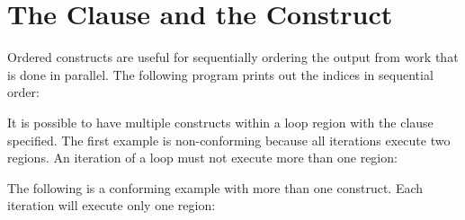 \pagebreak
\section{The  Clause and the  Construct}
\label{sec:ordered}

Ordered constructs  are useful for sequentially ordering the output from work that 
is done in parallel. The following program prints out the indices in sequential 
order:



It is possible to have multiple  constructs within a loop region 
with the  clause specified. The first example is non-conforming 
because all iterations execute two  regions. An iteration of a 
loop must not execute more than one  region:



The following is a conforming example with more than one  construct. 
Each iteration will execute only one  region:




